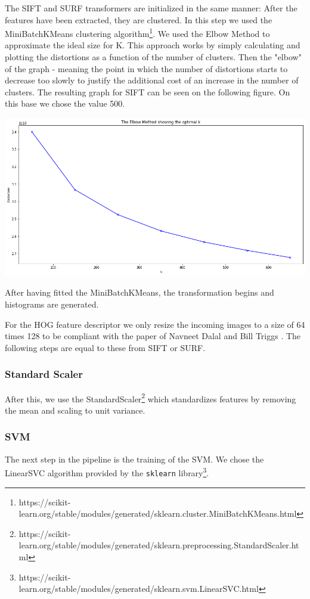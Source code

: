 \documentclass{scrartcl}
\begin{document}
The SIFT and SURF transformers are initialized in the same manner: After the features have been extracted, they are clustered.
In this step we used the MiniBatchKMeans clustering algorithm\footnote{https://scikit-learn.org/stable/modules/generated/sklearn.cluster.MiniBatchKMeans.html}. We used the Elbow Method to approximate the ideal size for K.
This approach works by simply calculating and plotting the distortions as a function of the number of clusters. Then the "elbow" of the graph - meaning the point in which the number of distortions starts to decrease too slowly to justify the additional cost of an increase in the number of clusters. The resulting graph for SIFT can be seen on the following figure. On this base we chose the value 500.
\begin{center}
  \includegraphics[scale=0.3]{img/kmeans-sift}
\end{center}
After having fitted the MiniBatchKMeans, the transformation begins and histograms are generated.

For the HOG feature descriptor we only resize the incoming images to a size of 64 times 128 to be compliant with the paper of Navneet Dalal and Bill Triggs \cite{Hog_article}. The following steps are equal to these from SIFT or SURF.

\subsubsection{Standard Scaler}
After this, we use the StandardScaler\footnote{https://scikit-learn.org/stable/modules/generated/sklearn.preprocessing.StandardScaler.html} which standardizes features by removing the mean and scaling to unit variance.

\subsubsection{SVM}
The next step in the pipeline is the training of the SVM.
We chose the LinearSVC algorithm provided by the \texttt{sklearn} library\footnote{https://scikit-learn.org/stable/modules/generated/sklearn.svm.LinearSVC.html}.
\end{document}

